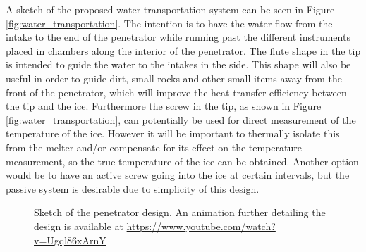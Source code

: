 A sketch of the proposed water transportation system can be seen in Figure \ref{fig:water_transportation}. The intention is to have the water flow from the intake to the end of the penetrator while running past the different instruments placed in chambers along the interior of the penetrator. The flute shape in the tip is intended to guide the water to the intakes in the side. This shape will also be useful in order to guide dirt, small rocks and other small items away from the front of the penetrator, which will improve the heat transfer efficiency between the tip and the ice. Furthermore the screw in the tip, as shown in Figure \ref{fig:water_transportation}, can potentially be used for direct measurement of the temperature of the ice. However it will be important to thermally isolate this from the melter and/or compensate for its effect on the temperature measurement, so the true temperature of the ice can be obtained. Another option would be to have an active screw going into the ice at certain intervals, but the passive system is desirable due to simplicity of this design. %
\begin{figure}[htb]
	\centering
	\captionsetup[subfigure]{width=0.25\textwidth}
	\caption{Sketch of the penetrator design. An animation further detailing the design is available at \url{https://www.youtube.com/watch?v=Ugql86xArnY}}
\end{figure}
